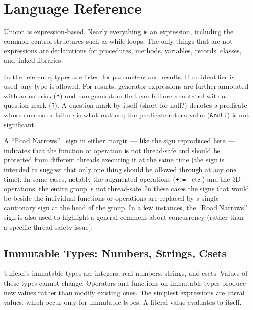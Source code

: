 \chapter{Language Reference}	%

Unicon is expression-based. Nearly everything is an expression,
including the common control structures such
as while loops. The only things that are not expressions are
declarations for procedures, methods, variables, records, classes, and
linked libraries.

In the reference, types are listed for parameters and results. If an
identifier is used, any type is allowed. For results,
generator expressions are further annotated with an
asterisk (\texttt{\textbf{*}}) and non-generators that can
fail are annotated with a question mark
(\texttt{?}). A question mark by itself (short for \textsf{null?})
denotes a predicate whose success or failure is what matters; the
predicate return value (\texttt{\&null}) is not significant.

A ``Road Narrows''  \WarningNotThreadSafe\ sign in either margin
--- like the sign reproduced here --- indicates that the function
or operation is not thread-safe and should be protected from different
threads executing it at the same time (the sign is intended to suggest
that only one thing should be allowed through at any one time). In some cases,
notably the augmented operations (\texttt{+:= } etc.) and the 3D operations,
the entire group is not thread-safe. In these cases the signs that would be
beside the individual functions or operations are replaced by a single cautionary
sign at the head of the group.
In a few instances, the ``Road Narrows'' sign is also used to highlight a general
comment about concurrency (rather than a specific thread-safety issue).

\section{Immutable Types: Numbers, Strings, Csets}

Unicon's immutable types are integers, real numbers,
strings, and csets. Values of these types cannot change. Operators and
functions on immutable types produce new values rather than modify
existing ones. The simplest expressions are literal values, which occur
only for immutable types. A literal value evaluates to itself.

